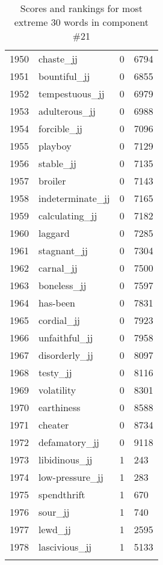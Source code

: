 \begin{longtable}[!htbp]{| rlr@{.}l |}
    1950 & chaste\_jj & 0 & 6794 \\
    1951 & bountiful\_jj & 0 & 6855 \\
    1952 & tempestuous\_jj & 0 & 6979 \\
    1953 & adulterous\_jj & 0 & 6988 \\
    1954 & forcible\_jj & 0 & 7096 \\
    1955 & playboy & 0 & 7129 \\
    1956 & stable\_jj & 0 & 7135 \\
    1957 & broiler & 0 & 7143 \\
    1958 & indeterminate\_jj & 0 & 7165 \\
    1959 & calculating\_jj & 0 & 7182 \\
    1960 & laggard & 0 & 7285 \\
    1961 & stagnant\_jj & 0 & 7304 \\
    1962 & carnal\_jj & 0 & 7500 \\
    1963 & boneless\_jj & 0 & 7597 \\
    1964 & has-been & 0 & 7831 \\
    1965 & cordial\_jj & 0 & 7923 \\
    1966 & unfaithful\_jj & 0 & 7958 \\
    1967 & disorderly\_jj & 0 & 8097 \\
    1968 & testy\_jj & 0 & 8116 \\
    1969 & volatility & 0 & 8301 \\
    1970 & earthiness & 0 & 8588 \\
    1971 & cheater & 0 & 8734 \\
    1972 & defamatory\_jj & 0 & 9118 \\
    1973 & libidinous\_jj & 1 & 243 \\
    1974 & low-pressure\_jj & 1 & 283 \\
    1975 & spendthrift & 1 & 670 \\
    1976 & sour\_jj & 1 & 740 \\
    1977 & lewd\_jj & 1 & 2595 \\
    1978 & lascivious\_jj & 1 & 5133 \\
    \hline
    \caption{Scores and rankings for most extreme 30 words in component \#21} \\
\end{longtable}

